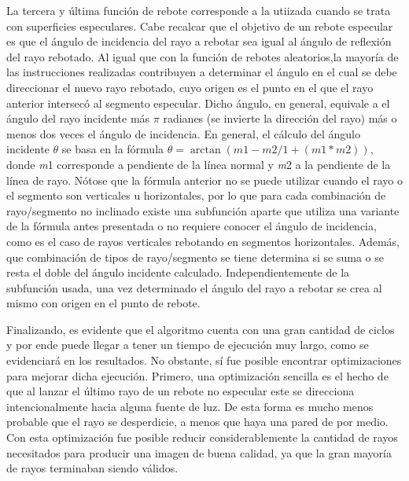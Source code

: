 \documentclass[conference]{IEEEtran}
\begin{document}
La tercera y última función de rebote corresponde a la utiizada cuando se trata con superficies especulares. Cabe recalcar que el objetivo de un rebote especular es que el ángulo de incidencia del rayo a rebotar sea igual al ángulo de reflexión del rayo rebotado. Al igual que con la función de rebotes aleatorios,la mayoría de las instrucciones realizadas contribuyen a determinar el ángulo en el cual se debe direccionar el nuevo rayo rebotado, cuyo origen es el punto en el que el rayo anterior intersecó al segmento especular. Dicho ángulo, en general, equivale a el ángulo del rayo incidente más $\pi$ radianes (se invierte la dirección del rayo) más o menos dos veces el ángulo de incidencia. En general, el cálculo del ángulo incidente $\theta$ se basa en la fórmula \(\theta = \arctan{(m1 - m2 / 1 + (m1 * m2))}\), donde \textit{m}1 corresponde a pendiente de la línea normal y \textit{m}2 a la pendiente de la línea de rayo. Nótose que la fórmula anterior no se puede utilizar cuando el rayo o el segmento son verticales u horizontales, por lo que para cada combinación de rayo/segmento no inclinado existe una subfunción aparte que utiliza una variante de la fórmula antes presentada o no requiere conocer el ángulo de incidencia, como es el caso de rayos verticales rebotando en segmentos horizontales. Además, que combinación de tipos de rayo/segmento se tiene determina si se suma o se resta el doble del ángulo incidente calculado. Independientemente de la subfunción usada, una vez determinado el ángulo del rayo a rebotar se crea al mismo con origen en el punto de rebote.

Finalizando, es evidente que el algoritmo cuenta con una gran cantidad de ciclos y por ende puede llegar a tener un tiempo de ejecución muy largo, como se evidenciará en los resultados. No obstante, sí fue posible encontrar optimizaciones para mejorar dicha ejecución. Primero, una optimización sencilla es el hecho de que al lanzar el último rayo de un rebote no especular este se direcciona intencionalmente hacia alguna fuente de luz. De esta forma es mucho menos probable que el rayo se desperdicie, a menos que haya una pared de por medio. Con esta optimización fue posible reducir considerablemente la cantidad de rayos necesitados para producir una imagen de buena calidad, ya que la gran mayoría de rayos terminaban siendo válidos. 
\end{document}
